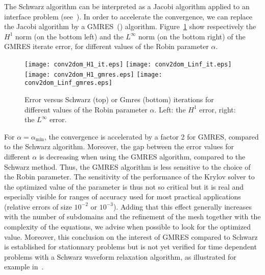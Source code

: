 \documentclass[final]{siamltex}
\begin{document}
The Schwarz algorithm can be interpreted as a Jacobi algorithm applied
to an interface problem (see~\cite{Nataf.4}). In order to accelerate the 
convergence, we can replace the Jacobi algorithm by a GMRES~(\cite{Saad}) algorithm.
Figure~\ref{fig:errconv2dom} show respectively the
$H^1$ norm (on the bottom left) and the $L^{\infty}$ norm (on the bottom right) of the GMRES iterate error,
for different values of the Robin parameter $\alpha$.
\vspace{-3mm}
\begin{figure}[H]
  \hspace*{-1.8cm}
  \texttt{[image: conv2dom\_H1\_it.eps]}\hspace{-0.7cm}
    \texttt{[image: conv2dom\_Linf\_it.eps]}
    \hspace*{-1.8cm}
 \texttt{[image: conv2dom\_H1\_gmres.eps]}\hspace{-0.7cm}
  \texttt{[image: conv2dom\_Linf\_gmres.eps]} 
 \caption{Error versus Schwarz (top) or Gmres (bottom) iterations for different values of the Robin 
parameter $\alpha$. Left: the $H^1$ error, right: the $L^\infty$ error.}
\label{fig:errconv2dom}  
\end{figure}
For $\alpha=\alpha_{\text{min}}$, the convergence is 
accelerated by a factor 2 for GMRES, compared to the Schwarz algorithm.
Moreover, the gap between the error values for different $\alpha$  
is decreasing when using the GMRES algorithm, compared to the Schwarz method.
Thus, the GMRES algorithm is less sensitive to the choice of the Robin
parameter. The sensitivity of the performance of the Krylov solver to the
optimized value of the parameter is thus not so critical but it is
real and especially visible for ranges of accuracy used for most
practical applications (relative errors of size $10^{-2}$ or
$10^{-3}$). Adding that this effect generally increases with the number
of subdomains and the refinement of the mesh \cite{Gander06} together with the complexity of the equations,
we advise when possible to look for the optimized value.
Moreover, this conclusion on the interest of GMRES compared to Schwarz is established for stationnary problems but is
not yet verified for time dependent problems with a Schwarz waveform relaxation algorithm,
as illustrated for example in~\cite{Hoang}.
\end{document}
